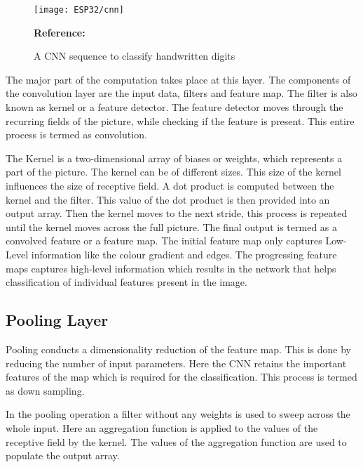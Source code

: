 \begin{figure}  
	\begin{center}
		\texttt{[image: ESP32/cnn]}
		\caption{A CNN sequence to classify handwritten digits} 
		\label{fig:A CNN sequence to classify handwritten digits}
		\footnotesize \textbf{Reference:} \cite{Swapna:2022}
	\end{center}
\end{figure}



The major part of the computation takes place at this layer. The components of the convolution layer are the input data, filters and feature map. The filter is also known as kernel or a feature detector. The feature detector moves through the recurring fields of the picture, while checking if the feature is present. This entire process is termed as convolution.

The Kernel is a two-dimensional array of biases or weights, which represents a part of the picture. The kernel can be of different sizes. This size of the kernel influences the size of receptive field. A dot product is computed between the kernel and the filter. This value of the dot product is then provided into an output array. Then the kernel moves to the next stride, this process is repeated until the kernel moves across the full picture. The final output is termed as a convolved feature or a feature map. The initial feature map only captures Low-Level information like the colour gradient and edges. The progressing feature maps captures high-level information which results in the network that helps classification of individual features present in the image. \cite{IBM:2020}

\subsection{Pooling Layer}

Pooling conducts a dimensionality reduction of the feature map. This is done by reducing the number of input parameters. Here the CNN retains the important features of the map which is required for the classification. This process is termed as down sampling.

In the pooling operation a filter without any weights is used to sweep across the whole input. Here an aggregation function is applied to the values of the receptive field by the kernel. The values of the aggregation function are used to populate the output array. \cite{IBM:2020}

